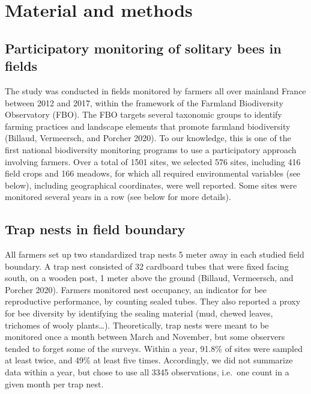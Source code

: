 \documentclass[smallextended]{svjour3}       %
\begin{document}
\hypertarget{meth}{%
\section{Material and methods}\label{meth}}

\hypertarget{meth:1}{%
\subsection{Participatory monitoring of solitary bees in
fields}\label{meth:1}}

The study was conducted in fields monitored by farmers all over mainland
France between 2012 and 2017, within the framework of the Farmland
Biodiversity Observatory (FBO). The FBO targets several taxonomic groups
to identify farming practices and landscape elements that promote
farmland biodiversity (Billaud, Vermeersch, and Porcher 2020). To our
knowledge, this is one of the first national biodiversity monitoring
programs to use a participatory approach involving farmers. Over a total
of 1501 sites, we selected 576 sites, including 416 field crops and 166
meadows, for which all required environmental variables (see below),
including geographical coordinates, were well reported. Some sites were
monitored several years in a row (see below for more details).

\hypertarget{trap-nests-in-field-boundary}{%
\subsection{Trap nests in field
boundary}\label{trap-nests-in-field-boundary}}

All farmers set up two standardized trap nests 5 meter away in each
studied field boundary. A trap nest consisted of 32 cardboard tubes that
were fixed facing south, on a wooden post, 1 meter above the ground
(Billaud, Vermeersch, and Porcher 2020). Farmers monitored nest
occupancy, an indicator for bee reproductive performance, by counting
sealed tubes. They also reported a proxy for bee diversity by
identifying the sealing material (mud, chewed leaves, trichomes of wooly
plants\ldots). Theoretically, trap nests were meant to be monitored once
a month between March and November, but some observers tended to forget
some of the surveys. Within a year, 91.8\% of sites were sampled at
least twice, and 49\% at least five times. Accordingly, we did not
summarize data within a year, but chose to use all 3345 observations,
i.e.~one count in a given month per trap nest.
\end{document}

